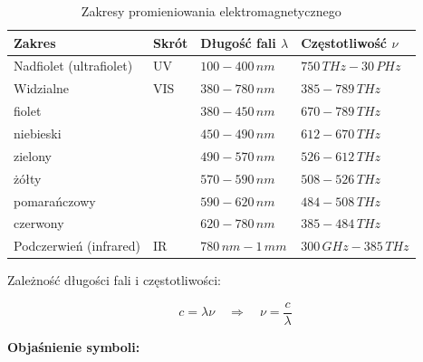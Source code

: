 \documentclass[12pt,a4paper]{article}
\newcommand{\oznaczenie}[2]{%
  \item $#1$ -- #2%
}
\begin{document}
\begin{table}[H]
\centering
\renewcommand{\arraystretch}{1.4}
\begin{tabular}{llll}
\toprule
\textbf{Zakres} & \textbf{Skrót} &
\textbf{Długość fali $\lambda$} & \textbf{Częstotliwość $\nu$} \\
\midrule
Nadfiolet (ultrafiolet) & UV  & $100 - 400\,\si{nm}$   & $750\,\si{THz} - 30\,\si{PHz}$ \\
Widzialne              & VIS  & $380 - 780\,\si{nm}$   & $385 - 789\,\si{THz}$ \\
\quad fiolet           &      & $380 - 450\,\si{nm}$   & $670 - 789\,\si{THz}$ \\
\quad niebieski        &      & $450 - 490\,\si{nm}$   & $612 - 670\,\si{THz}$ \\
\quad zielony          &      & $490 - 570\,\si{nm}$   & $526 - 612\,\si{THz}$ \\
\quad żółty            &      & $570 - 590\,\si{nm}$   & $508 - 526\,\si{THz}$ \\
\quad pomarańczowy     &      & $590 - 620\,\si{nm}$   & $484 - 508\,\si{THz}$ \\
\quad czerwony         &      & $620 - 780\,\si{nm}$   & $385 - 484\,\si{THz}$ \\
Podczerwień (infrared) & IR   & $780\,\si{nm} - 1\,\si{mm}$ & $300\,\si{GHz} - 385\,\si{THz}$ \\
\bottomrule
\end{tabular}
\caption{Zakresy promieniowania elektromagnetycznego}
\end{table}

Zależność długości fali i częstotliwości:
\begin{wzorbox}
\begin{equation}
  c = \lambda \nu \quad \Longrightarrow \quad \nu = \frac{c}{\lambda}
  \label{eq:predkosc_fali}
\end{equation}
\end{wzorbox}

\begin{objasnbox}
\textbf{Objaśnienie symboli:}
\end{objasnbox}
\end{document}
